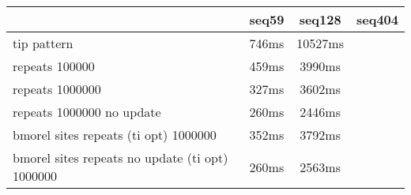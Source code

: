 \begin{tabular}{|l|c|c|c|}
\hline
 & seq59 & seq128 & seq404  \\
\hline
tip pattern & 746ms & 10527ms\\
\hline
repeats 100000 & 459ms & 3990ms\\
\hline
repeats 1000000 & 327ms & 3602ms\\
\hline
repeats 1000000 no update & 260ms & 2446ms\\
\hline
bmorel sites repeats (ti opt) 1000000 & 352ms & 3792ms\\
\hline
bmorel sites repeats no update (ti opt) 1000000 & 260ms & 2563ms\\
\hline
\end{tabular}
